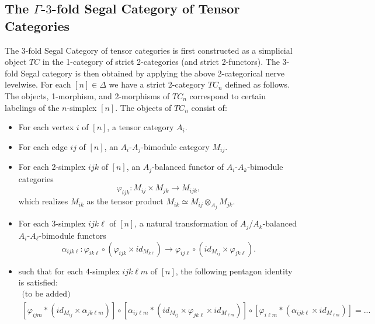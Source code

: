 \documentclass{amsart}
\begin{document}
\subsection{The $\Gamma$-$3$-fold Segal Category of Tensor Categories}


The 3-fold Segal Category of tensor categories is first constructed as a simplicial object $TC$ in the 1-category of strict 2-categories (and strict 2-functors). The 3-fold Segal category is then obtained by applying the above 2-categorical nerve levelwise. For each $[n] \in \Delta$ we have a strict 2-category $TC_n$ defined as follows. The objects, 1-morphism, and 2-morphisms of $TC_n$ correspond to certain labelings of the $n$-simplex $[n]$. The objects of $TC_n$ consist of:
\begin{itemize}
	\item For each vertex $i$ of $[n]$, a tensor category $A_i$. 
	\item For each edge $ij$ of $[n]$, an $A_i$-$A_j$-bimodule category $M_{ij}$.
	\item For each 2-simplex $ijk$ of $[n]$, an $A_j$-balanced functor of $A_i$-$A_k$-bimodule categories 
	\begin{equation*}
		\varphi_{ijk}: M_{ij} \times M_{jk} \to M_{ijk},
	\end{equation*}
	 which realizes $M_{ik}$ as the tensor product $M_{ik} \simeq M_{ij} \otimes_{A_j} M_{jk}$. 
	\item For each 3-simplex $ijk\ell$ of $[n]$, a natural transformation of $A_j$/$A_k$-balanced $A_i$-$A_\ell$-bimodule functors 
	\begin{equation*}
		\alpha_{ijk \ell}: \varphi_{i k \ell} \circ (\varphi_{ijk} \times id_{M_{k\ell}}) \to \varphi_{ij \ell} \circ (id_{M_{ij}} \times \varphi_{jk\ell}).
	\end{equation*}
	\item such that for each $4$-simplex $ijk\ell m$ of $[n]$, the following pentagon identity is satisfied:
	\begin{align*}
		\text{(to be added)}  \\ [\varphi_{ijm} * (id_{M_{ij}} \times \alpha_{jk\ell m})] \circ [\alpha_{ij\ell m} * (id_{M_{ij}} \times \varphi_{jk\ell} \times id_{M_{\ell m}})] \circ [\varphi_{i \ell m} * ( \alpha_{ijk \ell} \times id_{M_{\ell m}})] = ...
	\end{align*} 
\end{itemize}
\end{document}
